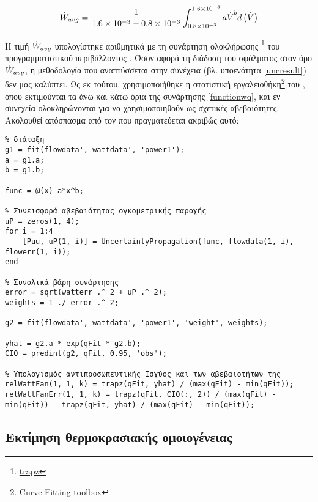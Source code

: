 \begin{equation}\label{pwrep}
\dot{W}_{\scriptsize{avg}} = \displaystyle\frac{1}{\num{1.6d-3} - \num{0.8d-3}} \int_{\num{0.8d-3}}^{\num{1.6d-3}} a{\dot{\volume}}^b d\left(\dot{\volume}\right)
\end{equation}

\noindent Η τιμή $\dot{W}_{\scriptsize{avg}}$ υπολογίστηκε αριθμητικά με τη συνάρτηση ολοκλήρωσης \footnote{\href{https://se.mathworks.com/help/matlab/ref/trapz.html}{trapz}} \cite{matlabtrapz} του προγραμματιστικού περιβάλλοντος \matlab. Όσον αφορά τη διάδοση του σφάλματος στον όρο $\dot{W}_{\scriptsize{avg}}$, η μεθοδολογία που αναπτύσσεται στην συνέχεια (βλ. υποενότητα \ref{uncresult}) δεν μας καλύπτει. Ως εκ τούτου, χρησιμοποιήθηκε η στατιστική εργαλειοθήκη\footnote{\href{https://www.mathworks.com/products/curvefitting.html}{Curve Fitting toolbox}} \cite{matlabcurvefitting} του \matlab, όπου εκτιμούνται τα άνω και κάτω όρια της συνάρτησης \ref{functionwq}, και εν συνεχεία ολοκληρώνονται για να χρησιμοποιηθούν ως σχετικές αβεβαιότητες. Ακολουθεί απόσπασμα από τον  που πραγματεύεται ακριβώς αυτό:

\begin{lstlisting}[firstnumber=561]
% Υπολογισμός αντιπροσωπευτικής ισχύος, και του αντίστοιχου σφάλματος, για κάθε
% διάταξη
g1 = fit(flowdata', wattdata', 'power1');
a = g1.a;
b = g1.b;
    
func = @(x) a*x^b;

% Συνεισφορά αβεβαιότητας ογκομετρικής παροχής    
uP = zeros(1, 4);
for i = 1:4
    [Puu, uP(1, i)] = UncertaintyPropagation(func, flowdata(1, i), flowerr(1, i)); 
end
 
% Συνολικά βάρη συνάρτησης   
error = sqrt(watterr .^ 2 + uP .^ 2);
weights = 1 ./ error .^ 2;

g2 = fit(flowdata', wattdata', 'power1', 'weight', weights);

yhat = g2.a * exp(qFit * g2.b);
CIO = predint(g2, qFit, 0.95, 'obs');

% Υπολογισμός αντιπροσωπευτικής Ισχύος και των αβεβαιοτήτων της
relWattFan(1, 1, k) = trapz(qFit, yhat) / (max(qFit) - min(qFit));
relWattFanErr(1, 1, k) = trapz(qFit, CIO(:, 2)) / (max(qFit) - min(qFit)) - trapz(qFit, yhat) / (max(qFit) - min(qFit));
\end{lstlisting}

\subsection{Εκτίμηση θερμοκρασιακής ομοιογένειας}

